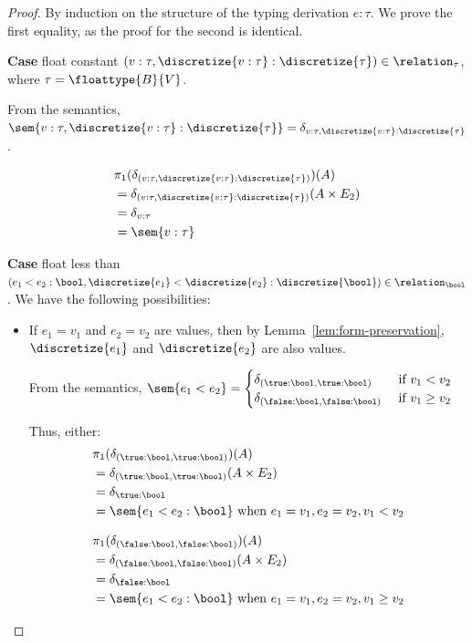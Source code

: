 \begin{proof}
	By induction on the structure of the typing derivation $e : \tau$. We prove the first equality, as the proof for the second is identical.

	\textbf{Case} float constant $(v : \tau, \discretize{v : \tau} : \discretize{\tau}) \in \relation_{\tau}$, where $\tau = \floattype{B}{V}$. 

	From the semantics, $\sem{v : \tau, \discretize{v : \tau} : \discretize{\tau}} = \delta_{v : \tau, \discretize{v : \tau} : \discretize{\tau}}$.

	\begin{align*}
		&\pi_1(\delta_{(v : \tau, \discretize{v : \tau} : \discretize{\tau})})(A) \\
		&= \delta_{(v : \tau, \discretize{v : \tau} : \discretize{\tau})}(A \times E_2) \\
		&= \delta_{v : \tau} \\
		&= \sem{v : \tau}
	\end{align*}

	\textbf{Case} float less than $(e_1 < e_2 : \bool, \discretize{e_1} < \discretize{e_2} : \discretize{\bool}) \in \relation_{\bool}$. We have the following possibilities:
	\begin{itemize}
		\item If $e_1 = v_1$ and $e_2 = v_2$ are values, then by Lemma~\ref{lem:form-preservation}, $\discretize{e_1}$ and $\discretize{e_2}$ are also values. 
		
		From the semantics, 
		$\sem{e_1 < e_2} = \begin{cases}
			\delta_{(\true:\bool, \true:\bool)} &\text{ if } v_1 < v_2 \\
			\delta_{(\false:\bool, \false:\bool)} &\text{ if } v_1 \geq v_2
		\end{cases}$
		
		Thus, either:
		\begin{align*}
			&\pi_1(\delta_{(\true:\bool, \true:\bool)})(A) \\
			&= \delta_{(\true:\bool, \true:\bool)}(A \times E_2) \\
			&= \delta_{\true:\bool} \\
			&= \sem{e_1 < e_2 : \bool} \text{ when } e_1 = v_1, e_2 = v_2, v_1 < v_2
		\end{align*}

		\begin{align*}
			&\pi_1(\delta_{(\false:\bool, \false:\bool)})(A) \\
			&= \delta_{(\false:\bool, \false:\bool)}(A \times E_2) \\
			&= \delta_{\false:\bool} \\
			&= \sem{e_1 < e_2 : \bool} \text{ when } e_1 = v_1, e_2 = v_2, v_1 \geq v_2
		\end{align*}


\end{itemize}
\end{proof}
